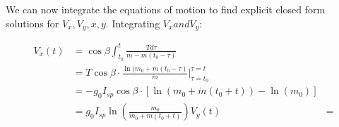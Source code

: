 \documentclass{article}
\begin{document}
We can now integrate the equations of motion to find explicit closed form solutions for $V_x, V_y, x,y$. Integrating $V_x and V_y$: 

\begin{align*}
V_x(t) &= \cos{\beta}\int_{t_0}^{t} \frac{Td\tau}{m-\dot{m}(t_0 - \tau)} \\
&= T\cos{\beta} \cdot \frac{\ln (m_0 + \dot{m}(t_0 - \tau)}{\dot{m}}\Big|_{\tau = t_0}^{\tau = t} \\
&= -g_0I_{sp}\cos\beta \cdot [\ln(m_0 + \dot{m}(t_0 + t)) - \ln(m_0)] \\
&= g_0I_{sp}\ln\left(\frac{m_0}{m_0 + \dot{m}(t_0 + t)}\right)

V_y(t) &= 
\end{align*}
\end{document}
